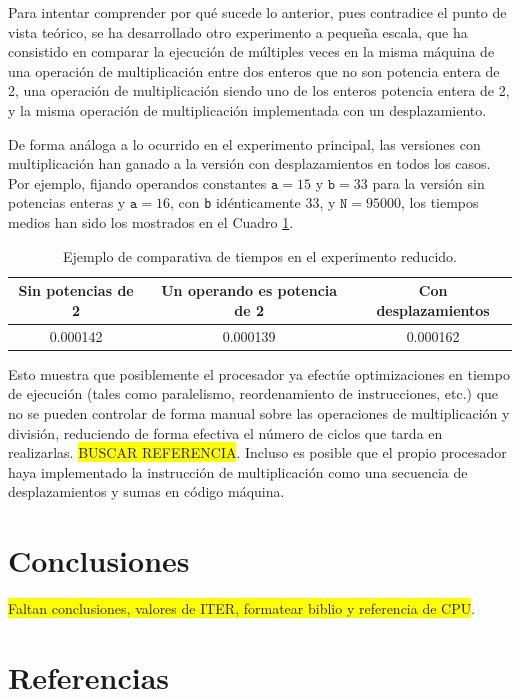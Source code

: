 \documentclass[11pt,a4paper,twoside]{article}
\theoremstyle{definition}
\begin{document}
	Para intentar comprender por qué sucede lo anterior, pues contradice el punto de vista teórico, se ha desarrollado otro experimento a pequeña escala, que ha consistido en comparar la ejecución de múltiples veces en la misma máquina de una operación de multiplicación entre dos enteros que no son potencia entera de 2, una operación de multiplicación siendo uno de los enteros potencia entera de 2, y la misma operación de multiplicación implementada con un desplazamiento. 
	
	De forma análoga a lo ocurrido en el experimento principal, las versiones con multiplicación han ganado a la versión con desplazamientos en todos los casos. Por ejemplo, fijando operandos constantes $\texttt{a}=15$ y $\texttt{b}=33$ para la versión sin potencias enteras y $\texttt{a}=16$, con \texttt{b} idénticamente 33, y $\texttt{N}=95000$, los tiempos medios han sido los mostrados en el Cuadro \ref{tabla1}.
	
	\begin{table} [H] \centering
		\begin{tabular} {| c | c | c |}
			\hline
			Sin potencias de 2 & Un operando es potencia de 2 & Con desplazamientos \\
			\hline
			 0.000142 & 0.000139 & 0.000162 \\
			 \hline
		\end{tabular}
		\caption{Ejemplo de comparativa de tiempos en el experimento reducido.}
		\label{tabla1}
	\end{table} 
	
	Esto muestra que posiblemente el procesador ya efectúe optimizaciones en tiempo de ejecución (tales como paralelismo, reordenamiento de instrucciones, etc.) que no se pueden controlar de forma manual sobre las operaciones de multiplicación y división, reduciendo de forma efectiva el número de ciclos que tarda en realizarlas. \colorbox{yellow}{BUSCAR REFERENCIA}. Incluso es posible que el propio procesador haya implementado la instrucción de multiplicación como una secuencia de desplazamientos y sumas en código máquina.
	
	\section{Conclusiones}
	
	\colorbox{yellow}{Faltan conclusiones, valores de ITER, formatear biblio y referencia de CPU}.
	
	
	\section*{Referencias}
	
\end{document}
